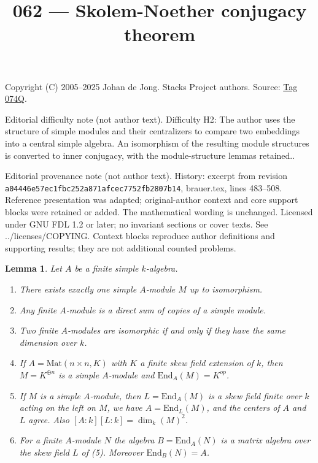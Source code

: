 \documentclass{amsart}
\theoremstyle{plain}
\newtheorem{lemma}[subsection]{Lemma}
\theoremstyle{definition}
\theoremstyle{remark}
\numberwithin{equation}{subsection}
\begin{document}
\title[Stacks Project, Tag 074Q]{062 --- Skolem-Noether conjugacy theorem}
\maketitle
\noindent Copyright (C) 2005--2025 Johan de Jong. Stacks Project authors. Source: \href{https://stacks.math.columbia.edu/tag/074Q}{Tag 074Q}.

\noindent Editorial difficulty note (not author text). Difficulty H2: The author uses the structure of simple modules and their centralizers to compare two embeddings into a central simple algebra. An isomorphism of the resulting module structures is converted to inner conjugacy, with the module-structure lemmas retained..

\noindent Editorial provenance note (not author text). History: excerpt from revision \texttt{a0444\allowbreak 6e57e\allowbreak c1fbc\allowbreak 252a8\allowbreak 71afc\allowbreak ec775\allowbreak 2fb28\allowbreak 07b14}, brauer.tex, lines 483--508. Reference presentation was adapted; original-author context and core support blocks were retained or added. The mathematical wording is unchanged. Licensed under GNU FDL 1.2 or later; no invariant sections or cover texts. See ../licenses/COPYING. Context blocks reproduce author definitions and supporting results; they are not additional counted problems.

\begin{lemma}
\label{lemma-simple-module-unique}
Let $A$ be a finite simple $k$-algebra.
\begin{enumerate}
\item There exists exactly one simple $A$-module $M$ up to isomorphism.
\item Any finite $A$-module is a direct sum of copies of a simple module.
\item Two finite $A$-modules are isomorphic if and only if they
have the same dimension over $k$.
\item If $A = \text{Mat}(n \times n, K)$ with $K$ a finite skew field
extension of $k$, then $M = K^{\oplus n}$ is a simple $A$-module and
$\text{End}_A(M) = K^{op}$.
\item If $M$ is a simple $A$-module, then $L = \text{End}_A(M)$
is a skew field finite over $k$ acting on the left on $M$, we have
$A = \text{End}_L(M)$, and the centers of $A$ and $L$ agree.
Also $[A : k] [L : k] = \dim_k(M)^2$.
\item For a finite $A$-module $N$ the algebra $B = \text{End}_A(N)$ is a
matrix algebra over the skew field $L$ of (5). Moreover $\text{End}_B(N) = A$.
\end{enumerate}
\end{lemma}
\end{document}
